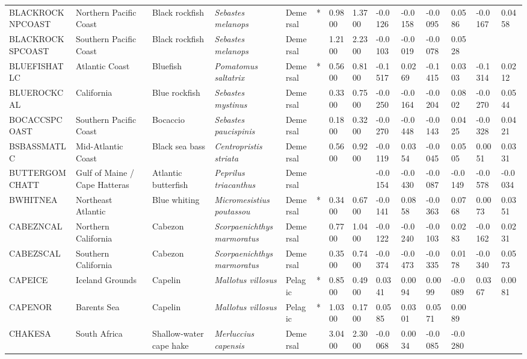 \begin{longtable}{p{2.6cm}p{1.9cm}p{1.7cm}p{1.6cm}p{1cm}p{0.3cm}p{1cm}p{1cm}p{1cm}p{1.1cm}p{1cm}p{1.1cm}p{1cm}p{1.1cm}}
  BLACKROCKNPCOAST & Northern Pacific Coast & Black rockfish & \textit{Sebastes melanops} & Demersal & * & 0.9800 & 1.3700 & -0.0126 & -0.0158 & -0.0095 & 0.0586 & -0.0167 & 0.0458 \\ 
  BLACKROCKSPCOAST & Southern Pacific Coast & Black rockfish & \textit{Sebastes melanops} & Demersal &   & 1.2100 & 2.2300 & -0.0103 & -0.0019 & -0.0078 & 0.0528 &  &  \\ 
  BLUEFISHATLC & Atlantic Coast & Bluefish & \textit{Pomatomus saltatrix} & Demersal & * & 0.5600 & 0.8100 & -0.1517 & 0.0269 & -0.1415 & 0.0303 & -0.1314 & 0.0212 \\ 
  BLUEROCKCAL & California & Blue rockfish & \textit{Sebastes mystinus} & Demersal &   & 0.3300 & 0.7500 & -0.0250 & -0.0164 & -0.0204 & 0.0802 & -0.0270 & 0.0544 \\ 
  BOCACCSPCOAST & Southern Pacific Coast & Bocaccio & \textit{Sebastes paucispinis} & Demersal &   & 0.1800 & 0.3200 & -0.0270 & -0.0448 & -0.0143 & 0.0425 & -0.0328 & 0.0421 \\ 
  BSBASSMATLC & Mid-Atlantic Coast & Black sea bass & \textit{Centropristis striata} & Demersal &   & 0.5600 & 0.9200 & -0.0119 & 0.0354 & -0.0045 & 0.0505 & 0.0051 & 0.0331 \\ 
  BUTTERGOMCHATT & Gulf of Maine / Cape Hatteras & Atlantic butterfish & \textit{Peprilus triacanthus} & Demersal &  &  &  & -0.0154 & -0.0430 & -0.0087 & -0.0149 & -0.0578 & -0.0034 \\ 
  BWHITNEA & Northeast Atlantic & Blue whiting & \textit{Micromesistius poutassou} & Demersal & * & 0.3400 & 0.6700 & -0.0141 & 0.0858 & -0.0363 & 0.0768 & 0.0073 & 0.0351 \\ 
  CABEZNCAL & Northern California & Cabezon & \textit{Scorpaenichthys marmoratus} & Demersal &   & 0.7700 & 1.0400 & -0.0122 & -0.0240 & -0.0103 & 0.0283 & -0.0162 & 0.0231 \\ 
  CABEZSCAL & Southern California & Cabezon & \textit{Scorpaenichthys marmoratus} & Demersal &   & 0.3500 & 0.7400 & -0.0374 & -0.0473 & -0.0335 & 0.0178 & -0.0340 & 0.0573 \\ 
  CAPEICE & Iceland Grounds & Capelin & \textit{Mallotus villosus} & Pelagic & * & 0.8500 & 0.4900 & 0.0341 & 0.0094 & 0.0099 & -0.0089 & 0.0367 & 0.0081 \\ 
  CAPENOR & Barents Sea & Capelin & \textit{Mallotus villosus} & Pelagic & * & 1.0300 & 0.1700 & 0.0585 & 0.0301 & 0.0571 & 0.0089 &  &  \\ 
  CHAKESA & South Africa & Shallow-water cape hake & \textit{Merluccius capensis} & Demersal &   & 3.0400 & 2.3000 & -0.0068 & 0.0034 & -0.0085 & -0.0280 &  &  \\ 

\end{longtable}
